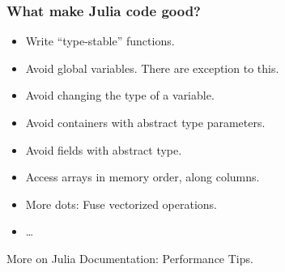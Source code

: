 \documentclass[10pt,t]{beamer}
\begin{document}
\begin{frame}
  \frametitle{What make Julia code good?}


  \begin{itemize}

  \item Write ``\alert{type-stable}'' functions.

  \item Avoid global variables. There are exception to this.

  \item Avoid changing the type of a variable.

  \item Avoid containers with abstract type parameters.

  \item Avoid fields with abstract type.

  \item Access arrays in memory order, along columns.

  \item More dots: Fuse vectorized operations.

  \item \ldots

  \end{itemize}


  More on
  {Julia Documentation: Performance Tips}.

\end{frame}
\end{document}
